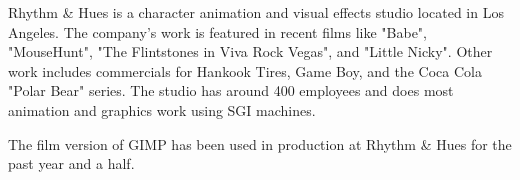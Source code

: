 Rhythm \& Hues is a character animation and visual effects studio located in
Los Angeles. The company's work is featured in recent films  like "Babe", "MouseHunt",
"The Flintstones in Viva Rock Vegas", and "Little Nicky". Other work includes
commercials for Hankook Tires, Game Boy, and the Coca Cola "Polar Bear" series.
The studio has around 400 employees and does most animation and
graphics work using SGI machines.

The film version of GIMP has been used in production at Rhythm \& Hues for
the past year and a half.
